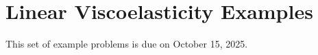 \section{Linear Viscoelasticity Examples}
\label{PS3}

This set of example problems is due on October 15, 2025. 

